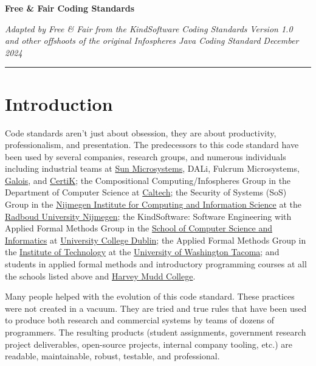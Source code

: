 \documentclass[10pt,letter]{article}
\begin{document}
\begin{center}
{\Large \textbf{Free \& Fair Coding Standards}}
\end{center}
\vspace{-6pt}

\textit{Adapted by Free \& Fair from the KindSoftware Coding Standards} \hspace{\fill} \textit{Version 1.0} \\
\textit{and other offshoots of the original Infospheres Java Coding Standard} \hspace{\fill} \textit{December 2024}

\vspace{-12pt}

\rule{\textwidth}{1pt}

\tableofcontents

\section{Introduction}

Code standards aren't just about obsession, they are about productivity, professionalism, and presentation.
The predecessors to this code standard have been used by several companies, research groups, and numerous individuals including industrial teams at \href{https://www.sun.com/}{Sun Microsystems}, DALi, Fulcrum Microsystems, \href{https://galois.com}{Galois}, and \href{https://certik.com}{CertiK}; the Compositional Computing/Infospheres Group in the Department of Computer Science at \href{https://www.caltech.edu/}{Caltech}; the Security of Systems (SoS) Group in the \href{https://www.ru.nl/en/institute-for-computing-and-information-sciences}{Nijmegen Institute for Computing and Information Science} at the \href{https://www.ru.nl/}{Radboud University Nijmegen}; the KindSoftware: Software Engineering with Applied Formal Methods Group in the \href{https://www.ucd.ie/cs/}{School of Computer Science and Informatics} at \href{https://www.ucd.ie/}{University College Dublin}; the Applied Formal Methods Group in the \href{https://www.tacoma.uw.edu/set}{Institute of Technology} at the \href{https://tacoma.uw.edu}{University of Washington Tacoma}; and students in applied formal methods and introductory programming courses at all the schools listed above and \href{https://www.hmc.edu}{Harvey Mudd College}.

Many people helped with the evolution of this code standard. These practices were not created in a vacuum. They are tried and true rules that have been used to produce both research and commercial systems by teams of dozens of programmers. The resulting products (student assignments, government research project deliverables, open-source projects, internal company tooling, etc.) are readable, maintainable, robust, testable, and professional.
\end{document}
